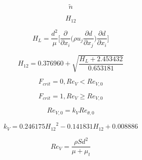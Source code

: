 {\newpage\clearpage
{}%
\begin{displaymath}
\tilde{n}
\end{displaymath}%
\lthtmldisplayZ
\lthtmlcheckvsize\clearpage}

{\newpage\clearpage
{}%
\begin{displaymath}
H_{12}
\end{displaymath}%
\lthtmldisplayZ
\lthtmlcheckvsize\clearpage}

{\newpage\clearpage
{}%
\begin{displaymath}
H_L = \frac{d^2}{\mu} \bigg[ \frac{\partial}{\partial x_i} \Big( \rho u_j \frac{\partial d}{\partial x_j} \Big) \frac{\partial d}{\partial x_i} \bigg]
\end{displaymath}%
\lthtmldisplayZ
\lthtmlcheckvsize\clearpage}

{\newpage\clearpage
{}%
\begin{displaymath}
H_{12} = 0.376960 + \sqrt{\frac{H_L + 2.453432}{0.653181}}
\end{displaymath}%
\lthtmldisplayZ
\lthtmlcheckvsize\clearpage}

{\newpage\clearpage
{}%
\begin{displaymath}
F_{crit} = 0, Re_{V} < Re_{V,0}
\end{displaymath}%
\lthtmldisplayZ
\lthtmlcheckvsize\clearpage}

{\newpage\clearpage
{}%
\begin{displaymath}
F_{crit} = 1, Re_{V} \ge Re_{V,0}
\end{displaymath}%
\lthtmldisplayZ
\lthtmlcheckvsize\clearpage}

{\newpage\clearpage
{}%
\begin{displaymath}
Re_{V,0} = k_V Re_{\theta,0}
\end{displaymath}%
\lthtmldisplayZ
\lthtmlcheckvsize\clearpage}

{\newpage\clearpage
{}%
\begin{displaymath}
k_V = 0.246175{H_{12}}^2 - 0.141831 H_{12} + 0.008886
\end{displaymath}%
\lthtmldisplayZ
\lthtmlcheckvsize\clearpage}

{\newpage\clearpage
{}%
\begin{displaymath}
Re_{V} = \frac{\rho S d^2}{\mu + \mu_t}
\end{displaymath}%
\lthtmldisplayZ
\lthtmlcheckvsize\clearpage}


